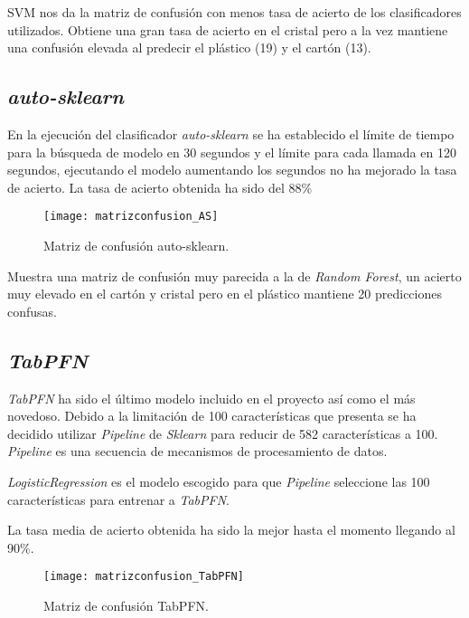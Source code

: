 SVM nos da la matriz de confusión con menos tasa de acierto de los clasificadores utilizados. Obtiene una gran tasa de acierto en el cristal pero a la vez mantiene una confusión elevada al predecir el plástico (19) y el cartón (13).
\clearpage

\subsection{\textit{auto-sklearn}}

En la ejecución del clasificador \textit{auto-sklearn} se ha establecido el límite de tiempo para la búsqueda de modelo en 30 segundos y el límite para cada llamada en 120 segundos, ejecutando el modelo aumentando los segundos no ha mejorado la tasa de acierto. La tasa de acierto obtenida ha sido del 88\%

\begin{figure}[h]
\begin{center}
	\texttt{[image: matrizconfusion\_AS]}
	\caption{Matriz de confusión auto-sklearn.}
	\label{fig:matrizconfusion_AS}
\end{center}
\end{figure}

Muestra una matriz de confusión muy parecida a la de \textit{Random Forest}, un acierto muy elevado en el cartón y cristal pero en el plástico mantiene 20 predicciones confusas.

\clearpage

\subsection{\textit{TabPFN}}

\textit{TabPFN} ha sido el último modelo incluido en el proyecto así como el más novedoso. Debido a la limitación de 100 características que presenta se ha decidido utilizar \textit{Pipeline} de \textit{Sklearn} para reducir de 582 características a 100. \textit{Pipeline} es una secuencia de mecanismos de procesamiento de datos.

\textit{LogisticRegression} es el modelo escogido para que \textit{Pipeline} seleccione las 100 características para entrenar a \textit{TabPFN}.

La tasa media de acierto obtenida ha sido la mejor hasta el momento llegando al 90\%.

\begin{figure}[h]
\begin{center}
	\texttt{[image: matrizconfusion\_TabPFN]}
	\caption{Matriz de confusión TabPFN.}
	\label{fig:matrizconfusion_TabPFN}
\end{center}
\end{figure}

